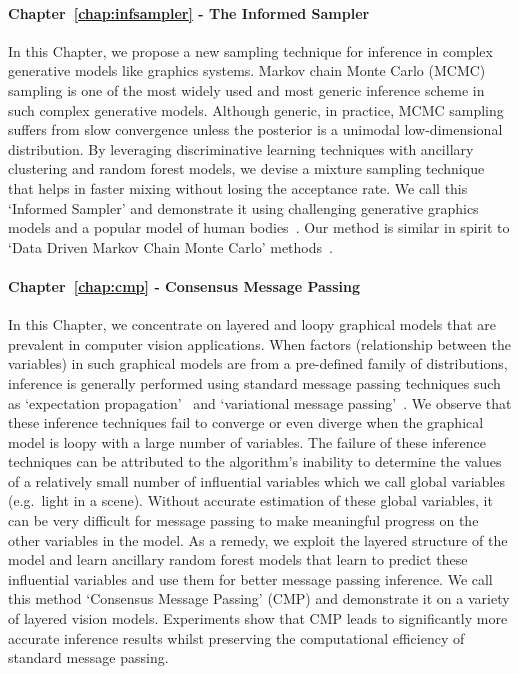 \vspace{-0.3cm}
\paragraph{Chapter~\ref{chap:infsampler} - The Informed Sampler}
In this Chapter, we propose a new sampling technique for inference
in complex generative models like graphics systems. Markov chain Monte Carlo (MCMC)
sampling is one of the most widely used and most generic inference scheme
in such complex generative models. Although generic, in practice,
MCMC sampling suffers from slow convergence unless the posterior is a unimodal low-dimensional
distribution. By leveraging discriminative learning techniques with ancillary clustering
and random forest models, we devise a mixture sampling technique that helps in faster mixing
without losing the acceptance rate. We call this `Informed Sampler' and demonstrate
it using challenging generative graphics models and a popular model of
human bodies~\cite{hirshberg2012coregistration}. Our method is similar in spirit
to ‘Data Driven Markov Chain Monte Carlo’ methods~\cite{zhu2000integrating}.

\vspace{-0.3cm}
\paragraph{Chapter~\ref{chap:cmp} - Consensus Message Passing}
In this Chapter, we concentrate on layered and loopy graphical models that are prevalent
in computer vision applications. When factors (relationship between the variables)
in such graphical models are from a pre-defined
family of distributions, inference is generally performed using
standard message passing techniques such as `expectation propagation'~\cite{Minka2001} and
`variational message passing'~\cite{Winn2005}. We observe that these inference techniques
fail to converge or even diverge when the graphical model is loopy with a large number of
variables. The failure of these inference techniques can be attributed to the algorithm's inability
to determine the values of a relatively small number of influential variables which we call
global variables (e.g.\ light in a scene). Without accurate estimation of these global
variables, it can be very difficult for message passing to make meaningful progress on the
other variables in the model. As a remedy, we exploit the layered structure of the model
and learn ancillary random forest models that learn to predict these influential variables
and use them for better message passing inference. We call this method `Consensus Message Passing' (CMP)
and demonstrate it on a variety of layered vision models. Experiments show that CMP
leads to significantly more accurate inference results whilst preserving the computational
efficiency of standard message passing.


